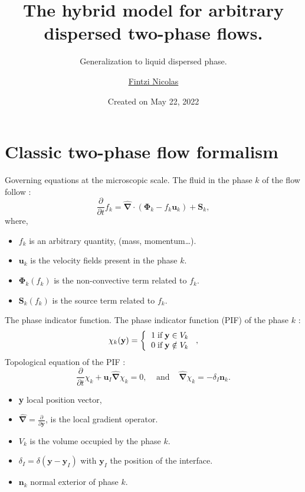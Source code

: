 \documentclass{sintefbeamer}
\title{The hybrid model for arbitrary dispersed two-phase flows.}
\subtitle{Generalization to liquid dispersed phase.}
\author{\href{mailto:qilong-kirov.liu@connect.polyu.hk}{Fintzi Nicolas}}
\date{Created on May 22, 2022}
\newcommand{\nablabh}{\hat{\bm{\nabla}}}
\newcommand{\pddt}{\frac{\partial}{\partial t}}
\begin{document}
\maketitle

\section{Classic two-phase flow formalism}

\begin{frame}{Governing equations at the microscopic scale.}
  The fluid in the phase $k$ of the flow follow :
  \begin{equation}
    \pddt f_k
    = \nablabh \cdot \left(
        \bm{\Phi}_k
        - f_k\textbf{u}_k
        \right)
    + \textbf{S}_k,
    \label{eq:general_conservation}
\end{equation}
where,
\begin{itemize}
  \item $f_k$ is an arbitrary quantity, (mass, momentum\ldots).
  \item $\textbf{u}_k$ is the velocity fields present in the phase $k$. 
  \item $\bm{\Phi}_k(f_k)$ is the non-convective term related to $f_k$.
  \item $\textbf{S}_k(f_k)$ is the source term related to $f_k$.
\end{itemize}
\end{frame}

\begin{frame}{The phase indicator function.}
  The phase indicator function (PIF) of the phase $k$ :
  \begin{equation}
    \chi_k(\textbf{y}) =  \left\{
      \begin{tabular}{cc}
        $1 \;\text{if} \;\textbf{y} \in V_k$\\
        $0 \;\text{if} \;\textbf{y} \notin V_k$
      \end{tabular}
      \right.,
      \label{eq:phase_indicator}
\end{equation}
Topological equation of the PIF :
\begin{equation}
  \pddt \chi_k
  + \textbf{u}_I  \nablabh \chi_k 
  = 0, \;\;\;\;\text{and}\;\;\;\;
    \nablabh \chi_k 
    = - \delta_I \textbf{n}_k.
  \label{eq:phaseindicator_transport}
\end{equation}

\begin{itemize}
  \item \textbf{y} local position vector,
  \item $\nablabh = \frac{\partial}{\partial \textbf{y}}$, is the local gradient operator.
  \item  $V_k$ is the volume occupied by the phase $k$.
  \item $\delta_I = \delta(\textbf{y} - \textbf{y}_I)$ with $\textbf{y}_I$ the position of the interface.
  \item $\textbf{n}_k$ normal exterior of phase $k$.
\end{itemize}
\end{frame}
\end{document}
